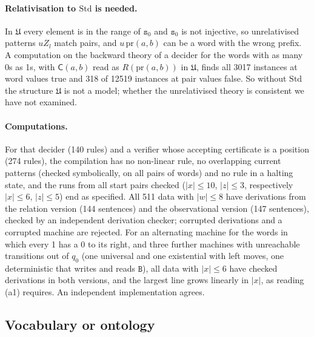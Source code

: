 \paragraph{Relativisation to $\mathrm{Std}$ is needed.} In $\mathfrak U$ every element is in the range of $\mathtt s_0$ and $\mathtt s_0$ is not injective, so unrelativised patterns $u Z_l$ match pairs, and $u\,\mathrm{pr}(a,b)$ can be a word with the wrong prefix. A computation on the backward theory of a decider for the words with as many 0s as 1s, with $\mathsf C(a,b)$ read as $R(\mathrm{pr}(a,b))$ in $\mathfrak U$, finds all 3017 instances at word values true and 318 of 12519 instances at pair values false. So without $\mathrm{Std}$ the structure $\mathfrak U$ is not a model; whether the unrelativised theory is consistent we have not examined.

\paragraph{Computations.} For that decider (140 rules) and a verifier whose accepting certificate is a position (274 rules), the compilation has no non-linear rule, no overlapping current patterns (checked symbolically, on all pairs of words) and no rule in a halting state, and the runs from all start pairs checked ($\lvert x\rvert\le10$, $\lvert z\rvert\le3$, respectively $\lvert x\rvert\le6$, $\lvert z\rvert\le5$) end as specified. All 511 data with $\lvert w\rvert\le8$ have derivations from the relation version (144 sentences) and the observational version (147 sentences), checked by an independent derivation checker; corrupted derivations and a corrupted machine are rejected. For an alternating machine for the words in which every 1 has a 0 to its right, and three further machines with unreachable transitions out of $q_0$ (one universal and one existential with left moves, one deterministic that writes and reads $\mathtt B$), all data with $\lvert x\rvert\le6$ have checked derivations in both versions, and the largest line grows linearly in $\lvert x\rvert$, as reading (a1) requires. An independent implementation agrees.

\subsection{Vocabulary or ontology}\label{app:terms:ontology}

